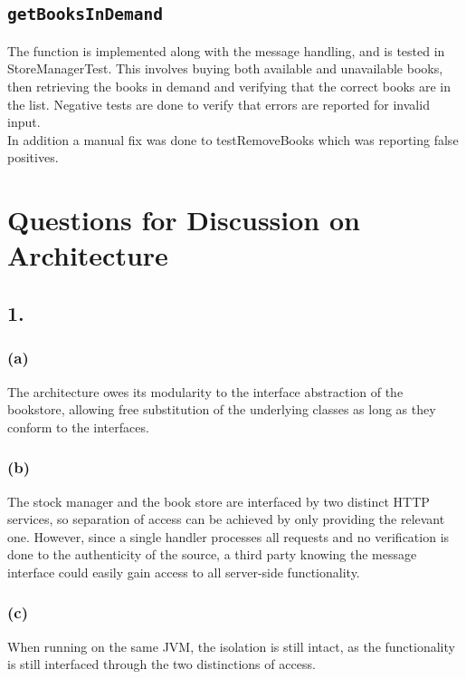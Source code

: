 \documentclass[12pt]{article}
\begin{document}
\subsection*{\texttt{getBooksInDemand}}

The function is implemented along with the message handling, and is tested in StoreManagerTest. This involves buying both available and unavailable books, then retrieving the books in demand and verifying that the correct books are in the list. Negative tests are done to verify that errors are reported for invalid input. \\
In addition a manual fix was done to testRemoveBooks which was reporting false positives.

\section*{Questions for Discussion on Architecture} %

\subsection*{1.} %

\subsubsection*{(a)} %

The architecture owes its modularity to the interface abstraction of the bookstore, allowing free substitution of the underlying classes as long as they conform to the interfaces.

\subsubsection*{(b)} %

The stock manager and the book store are interfaced by two distinct HTTP services, so separation of access can be achieved by only providing the relevant one. However, since a single handler processes all requests and no verification is done to the authenticity of the source, a third party knowing the message interface could easily gain access to all server-side functionality.

\subsubsection*{(c)} %

When running on the same JVM, the isolation is still intact, as the functionality is still interfaced through the two distinctions of access.
\end{document}
